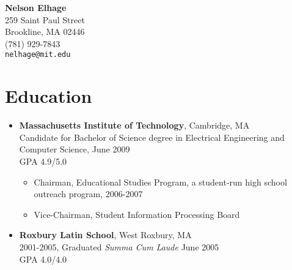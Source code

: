 \documentclass[letterpaper,10pt]{article}
\begin{document}
\begin{center}
  {\LARGE \bf Nelson Elhage}\\
  {\large
    259 Saint Paul Street \\
    Brookline, MA 02446 \\
    (781) 929-7843 \\
    \mbox{\small \tt nelhage@mit.edu}}
\end{center}

\section*{Education}
\vspace*{-0.2cm}
\begin{itemize}
  \item \textbf{Massachusetts Institute of Technology}, Cambridge, MA
    \\ Candidate for Bachelor of Science degree in Electrical
    Engineering and Computer Science, June 2009 \\
    GPA 4.9/5.0
    \vspace*{-0.2cm}
    \begin{itemize}
      \item Chairman, Educational Studies Program, a student-run
        high school outreach program, 2006-2007
      \item Vice-Chairman, Student Information Processing Board
    \end{itemize}
  \item \textbf{Roxbury Latin School}, West Roxbury, MA \\ 2001-2005,
    Graduated {\em Summa Cum Laude} June 2005 \\
    GPA 4.0/4.0
\end{itemize}

\vspace*{-0.7cm}
\end{document}

